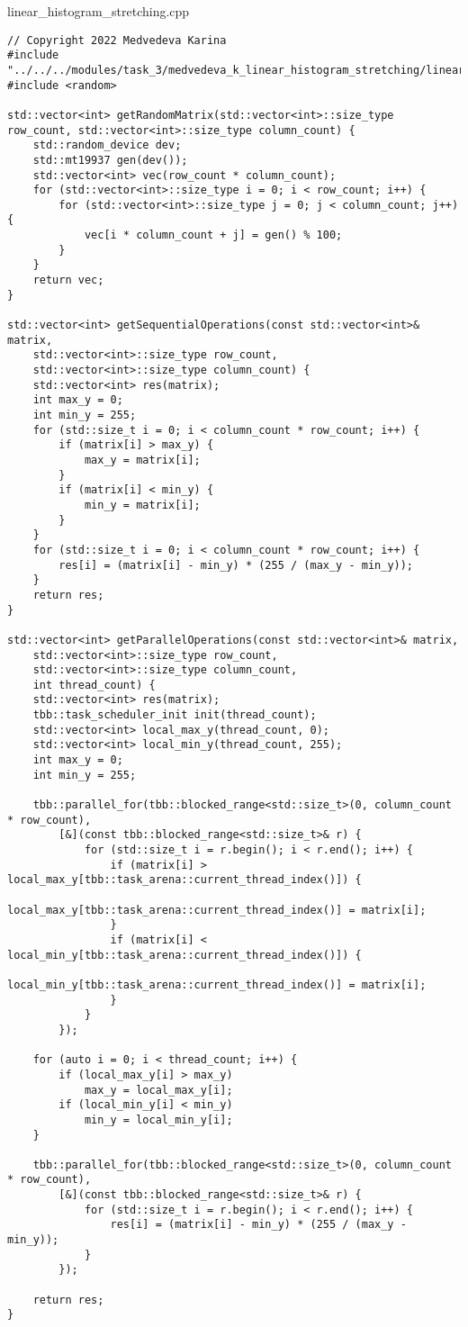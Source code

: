 \documentclass{report}
\begin{document}
\par linear\_histogram\_stretching.cpp
\begin{lstlisting}
// Copyright 2022 Medvedeva Karina
#include "../../../modules/task_3/medvedeva_k_linear_histogram_stretching/linear_histogram_stretching.h"
#include <random>

std::vector<int> getRandomMatrix(std::vector<int>::size_type row_count, std::vector<int>::size_type column_count) {
    std::random_device dev;
    std::mt19937 gen(dev());
    std::vector<int> vec(row_count * column_count);
    for (std::vector<int>::size_type i = 0; i < row_count; i++) {
        for (std::vector<int>::size_type j = 0; j < column_count; j++) {
            vec[i * column_count + j] = gen() % 100;
        }
    }
    return vec;
}

std::vector<int> getSequentialOperations(const std::vector<int>& matrix,
    std::vector<int>::size_type row_count,
    std::vector<int>::size_type column_count) {
    std::vector<int> res(matrix);
    int max_y = 0;
    int min_y = 255;
    for (std::size_t i = 0; i < column_count * row_count; i++) {
        if (matrix[i] > max_y) {
            max_y = matrix[i];
        }
        if (matrix[i] < min_y) {
            min_y = matrix[i];
        }
    }
    for (std::size_t i = 0; i < column_count * row_count; i++) {
        res[i] = (matrix[i] - min_y) * (255 / (max_y - min_y));
    }
    return res;
}

std::vector<int> getParallelOperations(const std::vector<int>& matrix,
    std::vector<int>::size_type row_count,
    std::vector<int>::size_type column_count,
    int thread_count) {
    std::vector<int> res(matrix);
    tbb::task_scheduler_init init(thread_count);
    std::vector<int> local_max_y(thread_count, 0);
    std::vector<int> local_min_y(thread_count, 255);
    int max_y = 0;
    int min_y = 255;

    tbb::parallel_for(tbb::blocked_range<std::size_t>(0, column_count * row_count),
        [&](const tbb::blocked_range<std::size_t>& r) {
            for (std::size_t i = r.begin(); i < r.end(); i++) {
                if (matrix[i] > local_max_y[tbb::task_arena::current_thread_index()]) {
                    local_max_y[tbb::task_arena::current_thread_index()] = matrix[i];
                }
                if (matrix[i] < local_min_y[tbb::task_arena::current_thread_index()]) {
                    local_min_y[tbb::task_arena::current_thread_index()] = matrix[i];
                }
            }
        });

    for (auto i = 0; i < thread_count; i++) {
        if (local_max_y[i] > max_y)
            max_y = local_max_y[i];
        if (local_min_y[i] < min_y)
            min_y = local_min_y[i];
    }

    tbb::parallel_for(tbb::blocked_range<std::size_t>(0, column_count * row_count),
        [&](const tbb::blocked_range<std::size_t>& r) {
            for (std::size_t i = r.begin(); i < r.end(); i++) {
                res[i] = (matrix[i] - min_y) * (255 / (max_y - min_y));
            }
        });

    return res;
}
\end{lstlisting}
\end{document}

